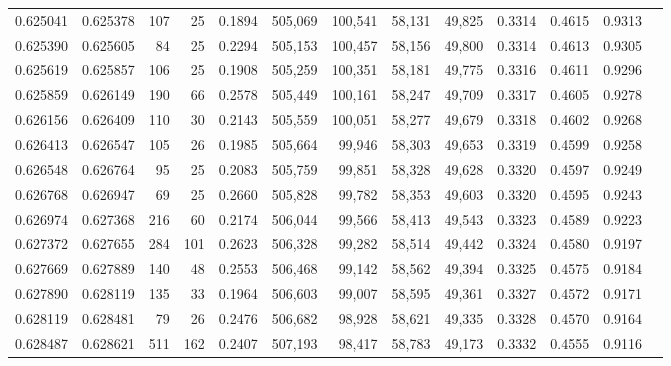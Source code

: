 \begin{tabular}{rrrrrrrrrrrrr}
0.625041 & 0.625378 &   107 &  25 &                                     0.1894 & 505,069 & 100,541 &  58,131 &  49,825 & 0.3314 & 0.4615 & 0.9313 \\
0.625390 & 0.625605 &    84 &  25 &                                     0.2294 & 505,153 & 100,457 &  58,156 &  49,800 & 0.3314 & 0.4613 & 0.9305 \\
0.625619 & 0.625857 &   106 &  25 &                                     0.1908 & 505,259 & 100,351 &  58,181 &  49,775 & 0.3316 & 0.4611 & 0.9296 \\
0.625859 & 0.626149 &   190 &  66 &                                     0.2578 & 505,449 & 100,161 &  58,247 &  49,709 & 0.3317 & 0.4605 & 0.9278 \\
0.626156 & 0.626409 &   110 &  30 &                                     0.2143 & 505,559 & 100,051 &  58,277 &  49,679 & 0.3318 & 0.4602 & 0.9268 \\
0.626413 & 0.626547 &   105 &  26 &                                     0.1985 & 505,664 &  99,946 &  58,303 &  49,653 & 0.3319 & 0.4599 & 0.9258 \\
0.626548 & 0.626764 &    95 &  25 &                                     0.2083 & 505,759 &  99,851 &  58,328 &  49,628 & 0.3320 & 0.4597 & 0.9249 \\
0.626768 & 0.626947 &    69 &  25 &                                     0.2660 & 505,828 &  99,782 &  58,353 &  49,603 & 0.3320 & 0.4595 & 0.9243 \\
0.626974 & 0.627368 &   216 &  60 &                                     0.2174 & 506,044 &  99,566 &  58,413 &  49,543 & 0.3323 & 0.4589 & 0.9223 \\
0.627372 & 0.627655 &   284 & 101 &                                     0.2623 & 506,328 &  99,282 &  58,514 &  49,442 & 0.3324 & 0.4580 & 0.9197 \\
0.627669 & 0.627889 &   140 &  48 &                                     0.2553 & 506,468 &  99,142 &  58,562 &  49,394 & 0.3325 & 0.4575 & 0.9184 \\
0.627890 & 0.628119 &   135 &  33 &                                     0.1964 & 506,603 &  99,007 &  58,595 &  49,361 & 0.3327 & 0.4572 & 0.9171 \\
0.628119 & 0.628481 &    79 &  26 &                                     0.2476 & 506,682 &  98,928 &  58,621 &  49,335 & 0.3328 & 0.4570 & 0.9164 \\
0.628487 & 0.628621 &   511 & 162 &                                     0.2407 & 507,193 &  98,417 &  58,783 &  49,173 & 0.3332 & 0.4555 & 0.9116 \\

\end{tabular}
